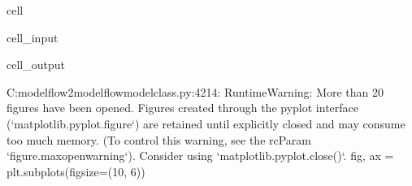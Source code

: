 \documentclass[letterpaper,10pt,english]{jupyterBook}
\begin{document}
\begin{sphinxuseclass}{cell}\begin{sphinxVerbatimInput}

\begin{sphinxuseclass}{cell_input}
\begin{sphinxVerbatim}[commandchars=\\\{\}]
 
\end{sphinxVerbatim}

\end{sphinxuseclass}\end{sphinxVerbatimInput}
\begin{sphinxVerbatimOutput}

\begin{sphinxuseclass}{cell_output}
\begin{sphinxVerbatim}[commandchars=\\\{\}]
C:\PYGZbs{}modelflow2\PYGZbs{}modelflow\PYGZbs{}modelclass.py:4214: RuntimeWarning: More than 20 figures have been opened. Figures created through the pyplot interface (`matplotlib.pyplot.figure`) are retained until explicitly closed and may consume too much memory. (To control this warning, see the rcParam `figure.max\PYGZus{}open\PYGZus{}warning`). Consider using `matplotlib.pyplot.close()`.
  fig, ax = plt.subplots(figsize=(10, 6))
\end{sphinxVerbatim}

\noindent{}


\end{sphinxuseclass}
\end{sphinxVerbatimOutput}
\end{sphinxuseclass}
\end{document}
